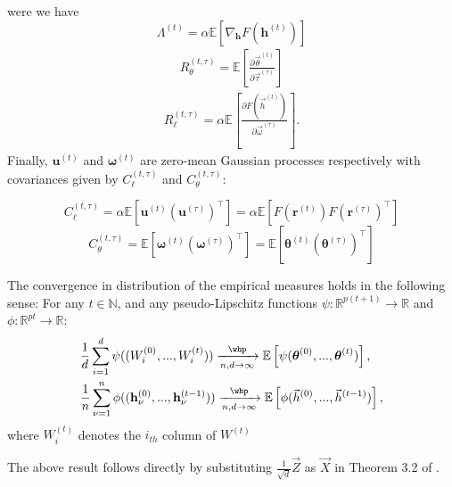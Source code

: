\begin{theorem}
    were we have
    \begin{equation}
        \Lambda^{(t)} = \alpha\mathbb{E}\left[ \nabla_{\boldsymbol{h}} F (\boldsymbol{h}^{(t)})\right]
    \end{equation}
    \begin{align} 
        R_\theta^{(t,\tau)} = \mathbb{E}\left[\frac{\partial  \vec \theta^{(t)}}{\partial  \vec \tau^{(\tau)}} \right]
    \end{align}
    \begin{align}
        R_\ell^{(t,\tau)} = \alpha \mathbb{E}\left[\frac{\partial  F(\vec h^{(t)})}{\partial  \vec\omega^{(\tau)}} \right] .
    \end{align}
    Finally, $\boldsymbol{u}^{(t)}$ and $\boldsymbol{\omega}^{(t)}$ are zero-mean Gaussian processes respectively with covariances given by $C_\ell^{(t,\tau)}$ and $C_\theta^{(t,\tau)}$:
    
    \begin{equation}
        C_\ell^{(t, \tau)} = \alpha\mathbb{E}\left[ \boldsymbol{u}^{(t)}\left(\boldsymbol{u}^{(\tau)}\right)^\top \right] = \alpha \mathbb{E}\left[ F(\boldsymbol{r}^{(t)})F (\boldsymbol{r}^{(\tau)})^\top\right]
    \end{equation}
    \begin{equation}
        C_\theta^{(t, \tau)} = \mathbb{E}\left[\boldsymbol{\omega}^{(t)}\left(\boldsymbol{\omega}^{(\tau)} \right)^\top\right] = \mathbb{E}\left[ \boldsymbol{\theta}^{(t)}\left(\boldsymbol{\theta}^{(\tau)}\right)^\top \right]
    \end{equation}

The convergence in distribution of the empirical measures holds in the following sense:
    For any $t \in \mathbb{N}$, and any 
        pseudo-Lipschitz functions $\psi: \mathbb{R}^{p(t+1)} \to \mathbb{R}$ and $\phi: \mathbb{R}^{pt} \to \mathbb{R}$:
        \begin{align}
            &\frac{1}{d}\sum_{i=1}^{d}\psi((W_{i}^{(0)}, ..., W_{i}^{(t)})) \xrightarrow[n,d \to 
            \infty]{\whp} \mathbb{E}\left[\psi(\boldsymbol{\theta}^{(0)}, ...,\boldsymbol{\theta}^{(t)})\right], \\ &\frac{1}{n}\sum_{\nu=1}^{n}\phi((\mathbf{h}_\nu^{(0)}, ..., \mathbf{h}_{\nu}^{(t-1)})) \xrightarrow[n,d \to \infty]{\whp} \mathbb{E}\left[\phi(\vec{h}^{(0)}, ..., \vec{h}^{(t-1)})\right],
        \end{align}
where $W_{i}^{(t)}$ denotes the $i_{th}$ column of $W^{(t)}$
\end{theorem}
The above result follows directly by substituting $\frac{1}{\sqrt{d}} \vec{Z}$ as $\vec{X}$ in Theorem 3.2 of \cite{gerbelot2022rigorous}.

